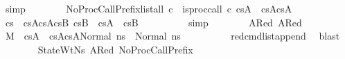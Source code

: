 \begin{isabellebody}
\ simp\isanewline
\ \ \ \ \ \ \isamarkupfalse%
\ NoProcCallPrefix{\isacharcolon}{\kern0pt}{\isachardoublequoteopen}list{\isacharunderscore}{\kern0pt}all\ {\isacharparenleft}{\kern0pt}{\isasymlambda}c{\isachardot}{\kern0pt}\ {\isasymnot}\ is{\isacharunderscore}{\kern0pt}proc{\isacharunderscore}{\kern0pt}call\ c{\isacharparenright}{\kern0pt}\ {\isacharparenleft}{\kern0pt}{\isacharparenleft}{\kern0pt}cs{}A\ {\isacharat}{\kern0pt}\ cs{}A{\isacharprime}{\kern0pt}{\isacharparenright}{\kern0pt}{\isacharat}{\kern0pt}cs{}A{\isacharprime}{\kern0pt}{\isacharprime}{\kern0pt}{\isacharparenright}{\kern0pt}{\isachardoublequoteclose}\isanewline
\ \ \ \ \ \ \ \ \isamarkupfalse%
\ {\isacartoucheopen}cs{}\ {\isacharequal}{\kern0pt}\ {\isacharparenleft}{\kern0pt}cs{}A{\isacharat}{\kern0pt}cs{}A{\isacharprime}{\kern0pt}{\isacharparenright}{\kern0pt}{\isacharat}{\kern0pt}cs{}B{\isacharprime}{\kern0pt}{\isacartoucheclose}\ {\isacartoucheopen}cs{}B{\isacharprime}{\kern0pt}\ {\isacharequal}{\kern0pt}\ cs{}A{\isacharprime}{\kern0pt}{\isacharprime}{\kern0pt}\ {\isacharat}{\kern0pt}\ cs{}B{\isacharprime}{\kern0pt}{\isacharprime}{\kern0pt}{\isacartoucheclose}\isanewline
\ \ \ \ \ \ \ \ \isamarkupfalse%
\ simp\isanewline
\ \ \ \ \ \ \isamarkupfalse%
\ A{}Red{}\ A{}Red{}\ \isamarkupfalse%
\ {\isachardoublequoteopen}M{\isacharcomma}{\kern0pt}{\isasymLambda}{\isacharcomma}{\kern0pt}{\isasymGamma}{\isacharcomma}{\kern0pt}{\isasymOmega}\ {\isasymturnstile}\ {\isasymlangle}{\isacharparenleft}{\kern0pt}cs{}A\ {\isacharat}{\kern0pt}\ cs{}A{\isacharprime}{\kern0pt}{\isacharparenright}{\kern0pt}{\isacharat}{\kern0pt}cs{}A{\isacharprime}{\kern0pt}{\isacharprime}{\kern0pt}{\isacharcomma}{\kern0pt}Normal\ ns{}{\isasymrangle}\ {\isacharbrackleft}{\kern0pt}{\isasymrightarrow}{\isacharbrackright}{\kern0pt}\ Normal\ ns{}{\isacharprime}{\kern0pt}{\isacharprime}{\kern0pt}{\isachardoublequoteclose}\isanewline
\ \ \ \ \ \ \ \ \isamarkupfalse%
\ red{\isacharunderscore}{\kern0pt}cmd{\isacharunderscore}{\kern0pt}list{\isacharunderscore}{\kern0pt}append\ \isamarkupfalse%
\ blast\isanewline
\ \ \ \ \ \ \isamarkupfalse%
\ StateWtNs{}{\isacharprime}{\kern0pt}\ A{}Red{}\ NoProcCallPrefix\ \isamarkupfalse%

\end{isabellebody}

